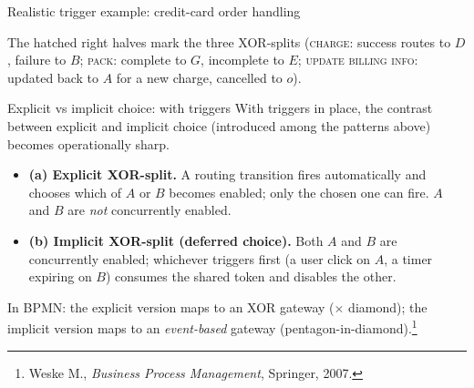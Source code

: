 \begin{examplebox}{Realistic trigger example: credit-card order handling}
\begin{center}
{}
\end{center}
The hatched right halves mark the three XOR-splits (\textsc{charge}: success routes to $D$, failure to $B$; \textsc{pack}: complete to $G$, incomplete to $E$; \textsc{update billing info}: updated back to $A$ for a new charge, cancelled to $o$).
\end{examplebox}

\begin{notebox}{Explicit vs implicit choice: with triggers}
With triggers in place, the contrast between explicit and implicit choice (introduced among the patterns above) becomes operationally sharp.

\begin{itemize}
  \item \textbf{(a) Explicit XOR-split.} A routing transition fires automatically and chooses which of $A$ or $B$ becomes enabled; only the chosen one can fire. $A$ and $B$ are \emph{not} concurrently enabled.
  \item \textbf{(b) Implicit XOR-split (deferred choice).} Both $A$ and $B$ are concurrently enabled; whichever triggers first (a user click on $A$, a timer expiring on $B$) consumes the shared token and disables the other.
\end{itemize}

In BPMN: the explicit version maps to an XOR gateway ($\times$ diamond); the implicit version maps to an \emph{event-based} gateway (pentagon-in-diamond).\footnote{Weske M., \emph{Business Process Management}, Springer, 2007.}
\end{notebox}

